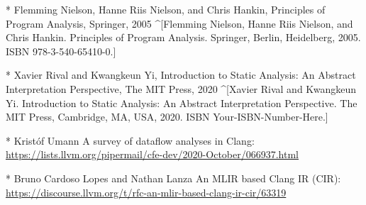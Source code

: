 \begin{markdown}
* Flemming Nielson, Hanne Riis Nielson, and Chris Hankin, Principles of Program Analysis, Springer, 2005 ^[Flemming Nielson, Hanne Riis Nielson, and Chris Hankin. Principles of Program Analysis. Springer, Berlin, Heidelberg, 2005. ISBN 978-3-540-65410-0.]

* Xavier Rival and Kwangkeun Yi, Introduction to Static Analysis: An Abstract Interpretation Perspective, The MIT Press, 2020 ^[Xavier Rival and Kwangkeun Yi. Introduction to Static Analysis: An Abstract Interpretation Perspective. The MIT Press, Cambridge, MA, USA, 2020. ISBN Your-ISBN-Number-Here.]

* Kristóf Umann A survey of dataflow analyses in Clang: \url{https://lists.llvm.org/pipermail/cfe-dev/2020-October/066937.html}

* Bruno Cardoso Lopes and Nathan Lanza An MLIR based Clang IR (CIR): \url{https://discourse.llvm.org/t/rfc-an-mlir-based-clang-ir-cir/63319}
\end{markdown}